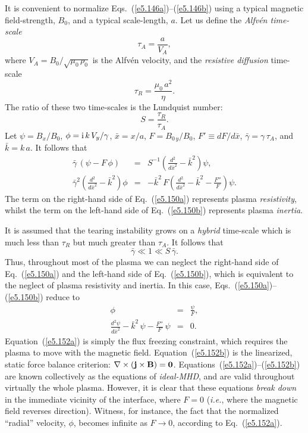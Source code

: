 It is convenient to normalize Eqs.~(\ref{e5.146a})--(\ref{e5.146b}) using a typical magnetic
field-strength, $B_0$, and a typical scale-length, $a$. Let us define the 
{\em Alfv\'{e}n time-scale}
\begin{equation}
\tau_A = \frac{a}{V_A},
\end{equation}
 where $V_A = B_0/\sqrt{\mu_0\,\rho_0}$
is the Alfv\'{e}n velocity, and the {\em resistive diffusion} time-scale
\begin{equation}\label{e5.148}
\tau_R = \frac{\mu_0\,a^2}{\eta}.
\end{equation}
The ratio of these two time-scales is the Lundquist number:
\begin{equation}
S = \frac{\tau_R}{\tau_A}.
\end{equation}
Let
$\psi= B_x/B_0$, $\phi = {\rm i}\,k\,V_y/\gamma$, $\bar{x}=x/a$, 
$F=B_{0\,y}/B_0$, $F'\equiv dF/d\bar{x}$, $\bar{\gamma} = \gamma\,\tau_A$,
and $\bar{k} = k\,a$. It follows that
\begin{eqnarray}\label{e5.150a}
\bar{\gamma}\,(\psi-F\,\phi) &=& S^{-1}\left(\frac{d^2}{d\bar{x}^2}-\bar{k}^2\right)
\psi,\\[0.5ex]\label{e5.150b}
\bar{\gamma}^2\left(\frac{d^2}{d\bar{x}^2} -\bar{k}^2\right)\phi
&=& -\bar{k}^2\,
F \left( \frac{d^2}{d\bar{x}^2} -\bar{k}^2 - \frac{F''}{F}\right) \psi.
\end{eqnarray}
The term on the right-hand side of Eq.~(\ref{e5.150a}) represents plasma
{\em resistivity}, whilst the term on the left-hand side of Eq.~(\ref{e5.150b})
represents plasma {\em inertia}.

It is assumed that the tearing instability  grows on a {\em hybrid} time-scale 
which is much less than $\tau_R$ but much greater than $\tau_A$. It follows
that 
\begin{equation}
\bar{\gamma} \ll 1 \ll S\,\bar{\gamma}.
\end{equation}
Thus, throughout most of the plasma we can neglect the right-hand side of
Eq.~(\ref{e5.150a}) and the left-hand side of Eq.~(\ref{e5.150b}), which is equivalent to
the neglect of plasma resistivity and inertia. In this case, Eqs.~(\ref{e5.150a})--(\ref{e5.150b})
reduce to
\begin{eqnarray}\label{e5.152a}
\phi &=& \frac{\psi}{F},\\[0.5ex]\label{e5.152b}
\frac{d^2\psi}{d\bar{x}^2} - \bar{k}^2\,\psi - \frac{F''}{F}\,\psi &=& 0.
\end{eqnarray}
Equation~(\ref{e5.152a}) is simply the flux freezing constraint, which requires the
plasma to move with the magnetic field. Equation~(\ref{e5.152b}) is the linearized,
static 
force balance criterion: $\nabla\times({\bf j}\times{\bf B}) = {\bf0}$.
Equations~(\ref{e5.152a})--(\ref{e5.152b}) are known collectively as the equations of {\em ideal-MHD}, and are valid
throughout virtually the whole plasma. However, it is clear that these
equations {\em break down} in the immediate vicinity of the interface, where $F=0$
({\em i.e.}, where the magnetic field reverses direction). Witness, for instance,
the fact that the normalized ``radial'' velocity, $\phi$, becomes infinite as
$F\rightarrow 0$, according to Eq.~(\ref{e5.152a}). 

